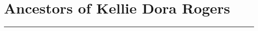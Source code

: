 \documentclass[12pt]{article}
\newcommand{\sectiondivider}{%
  \begin{center}
    \color{divider}\rule{5cm}{0.5pt}
  \end{center}
  \vspace{1.2em}
}
\begin{document}
\section*{Ancestors of Kellie Dora Rogers}
\sectiondivider




\end{document}
